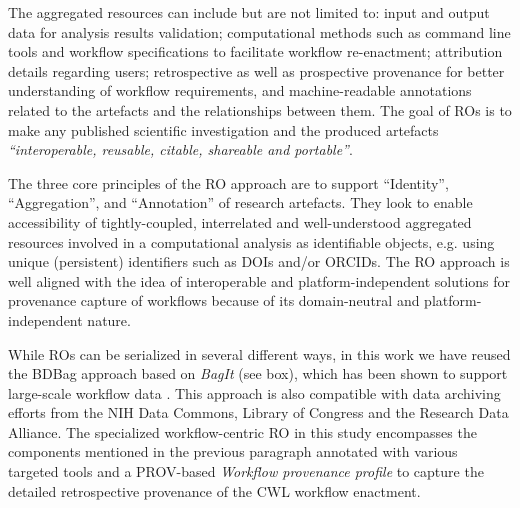 \documentclass[a4paper,num-refs]{oup-contemporary}
\begin{document}
The aggregated resources can include but are not limited to: input and output data for analysis results validation; computational methods such as command line tools and workflow specifications to facilitate workflow re-enactment; attribution details regarding users; retrospective as well as prospective provenance for better understanding of workflow requirements, and machine-readable annotations related to the artefacts and the relationships between them. The goal of ROs is to make any published scientific investigation and the produced artefacts \textit{“interoperable, reusable, citable, shareable and portable”}.

The three core principles \citep{roprinciples} of the RO approach are to support ``Identity'', ``Aggregation'', and ``Annotation'' of research artefacts. They look to enable accessibility of tightly-coupled, interrelated and well-understood aggregated resources involved in a computational analysis as identifiable objects, e.g. using unique (persistent) identifiers such as DOIs and/or ORCIDs. The RO approach is well aligned with the idea of interoperable and platform-independent solutions for provenance capture of workflows because of its domain-neutral and platform-independent nature. 

While ROs can be serialized in several different ways, in this work we have reused the BDBag approach based on \textit{BagIt} (see box), which has been shown to support large-scale workflow data \citep{chard_2016}. This approach is also compatible with data archiving efforts from the NIH Data Commons, Library of Congress and the Research Data Alliance. The specialized workflow-centric RO in this study encompasses the components mentioned in the previous paragraph annotated with various targeted tools and a PROV-based \textit{Workflow provenance profile} to capture the detailed retrospective provenance of the CWL workflow enactment.
\end{document}
